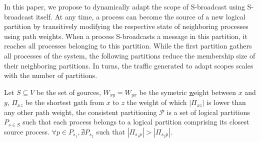 
In this paper, we propose to dynamically adapt the scope of
S-broadcast using S-broadcast itself.  At any time, a process can
become the source of a new logical partition by transitively modifying
the respective state of neighboring processes using path weights.
When a process S-broadcasts a message in this partition, it reaches
all processes belonging to this partition. While the first partition
gathers all processes of the system, the following partitions reduce
the membership size of their neighboring partitions. In turns, the
traffic generated to adapt scopes scales with the number of
partitions.
 
\begin{definition}
  Let $S \subseteq V$ be the set of \underline{s}ources, $W_{xy} =
  W_{yx}$ be the symetric \underline{w}eight between $x$ and $y$,
  $\Pi_{xz}$ be the shortest \underline{p}ath from $x$ to $z$ the
  weight of which $|\Pi_{xz}|$ is lower than any other path weight,
  the consistent partitioning $\mathcal{P}$ is a set of logical
  partitions $P_{s\in S}$ such that each process belongs to a logical
  partition comprising its closest source process.  $\forall p \in
  P_{s_1}, \nexists P_{s_2}$ such that $|\Pi_{s_1p}| > |\Pi_{s_2p}|$.
\end{definition}



